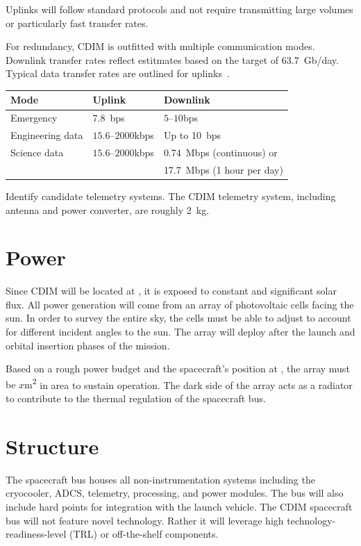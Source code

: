 \documentclass{ws-jai}
\begin{document}
Uplinks will follow standard protocols and not require transmitting large volumes or particularly fast transfer rates.

\begin{wstable}[htp]
  \caption{For redundancy, CDIM is outfitted with multiple communication modes. Downlink transfer rates reflect estitmates based on the target of \SI{63.7}{Gb/day}. Typical data transfer rates are outlined for uplinks~\cite{smad2015}.
\label{tab:telemetry}}
  \begin{tabular}{@{}lll@{}} \toprule
    Mode & Uplink & Downlink \\ \midrule
    Emergency & \SI{7.8}{bps} & $5$--$10$\si{bps} \\
    Engineering data & $15.6$--$2000$\si{kbps} & Up to \SI{10}{bps} \\
    Science data & $15.6$--$2000$\si{kbps} & \SI{0.74}{Mbps} (continuous) or \\
    & & \SI{17.7}{Mbps} (1 hour per day)\\\bottomrule
  \end{tabular}
\end{wstable}
{\color{red}Identify candidate telemetry systems.}
The CDIM telemetry system, including antenna and power converter, are roughly \SI{2}{kg}.

\section{Power}
\label{sec:power}
Since CDIM will be located at \Ltwo, it is exposed to constant and significant solar flux.
All power generation will come from an array of photovoltaic cells facing the sun.
In order to survey the entire sky, the cells must be able to adjust to account for different incident angles to the sun.
The array will deploy after the launch and orbital insertion phases of the mission.

Based on a rough power budget and the spacecraft's position at \Ltwo, {\color{red}the array must be $x$\si{\meter\squared}} in area to sustain operation.
The dark side of the array acts as a radiator to contribute to the thermal regulation of the spacecraft bus.

\section{Structure}
\label{sec:structure}
The spacecraft bus houses all non-instrumentation systems including the cryocooler, ADCS, telemetry, processing, and power modules.
The bus will also include hard points for integration with the launch vehicle.
The CDIM spacecraft bus will not feature novel technology. Rather it will leverage high technology-readiness-level (TRL) or off-the-shelf components.
\end{document}
